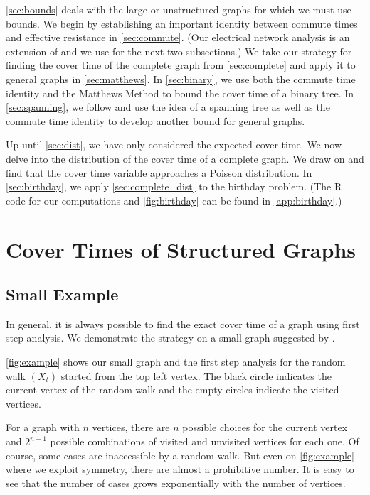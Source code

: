 \documentclass[12pt]{article}
\theoremstyle{definition}
\begin{document}
\cref{sec:bounds} deals with the large or unstructured graphs 
for which we must use bounds.
We begin by establishing an important identity between
commute times and effective resistance in \cref{sec:commute}.
(Our electrical network analysis is an extension of \cite{DS84}
and we use \cite{LP17} for the next two subsections.)
We take our strategy for finding the cover time of the complete graph
from \cref{sec:complete} and apply it to general graphs in \cref{sec:matthews}.
In \cref{sec:binary}, we use both the commute time identity and the Matthews Method
to bound the cover time of a binary tree.
In \cref{sec:spanning}, we follow \cite{AF14} and use the idea of a spanning tree
as well as the commute time identity to develop another bound for general graphs.

Up until \cref{sec:dist}, we have only considered the expected cover time.
We now delve into the distribution of the cover time of a complete graph.
We draw on \cite{Du11} and find that the cover time variable approaches a Poisson
distribution.
In \cref{sec:birthday}, we apply \cref{sec:complete_dist} to the birthday problem.
(The R code for our computations and \cref{fig:birthday} can be found in \cref{app:birthday}.)

\section{Cover Times of Structured Graphs}\label{sec:structured_graphs}

\subsection{Small Example}\label{sec:small_example}
In general, it is always possible to find the exact cover time
of a graph using first step analysis.
We demonstrate the strategy on a small graph suggested by \cite{BH94}.

\cref{fig:example} shows our small graph and the first step analysis
for the random walk $(X_t)$ started from the top left vertex.
The black circle indicates the current vertex of the random walk
and the empty circles indicate the visited vertices.

For a graph with $n$ vertices, there are $n$ possible choices for the current
vertex and $2^{n-1}$ possible combinations of visited and unvisited vertices
for each one.
Of course, some cases are inaccessible by a random walk.
But even on \cref{fig:example} where we exploit symmetry,
there are almost a prohibitive number.
It is easy to see that the number of cases 
grows exponentially with the number of vertices.
\end{document}
